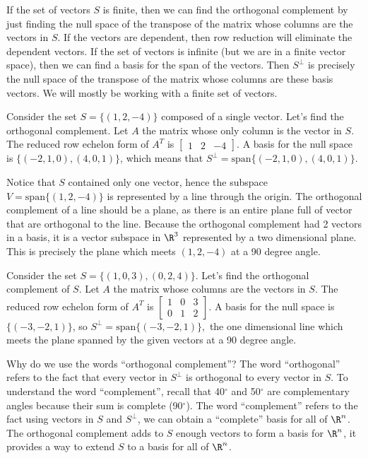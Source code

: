 If the set of vectors $S$ is finite, then we can find the orthogonal complement by just finding the null space of the transpose of the matrix whose columns are the vectors in $S$. 
If the vectors are dependent, then row reduction will eliminate the dependent vectors. 
If the set of vectors is infinite (but we are in a finite vector space), then we can find a basis for the span of the vectors. 
Then $S^\perp$ is precisely the null space of the transpose of the matrix whose columns are these basis vectors.  
We will mostly be working with a finite set of vectors.

\begin{example}
Consider the set  $S=\{(1,2,-4)\}$ composed of a single vector. Let's find the orthogonal complement.
Let $A$ the matrix whose only column is the vector in $S$. 
The reduced row echelon form of $A^T$ is $\begin{bmatrix}1&2&-4\end{bmatrix}$. 
A basis for the null space is $\{(-2,1,0), (4,0,1)\}$, which means that $S^\perp = \text{span}\{(-2,1,0), (4,0,1)\}$. 

Notice that $S$ contained only one vector, hence the subspace $V = \text{span}\{(1,2,-4)\}$ is represented by a line through the origin. 
The orthogonal complement of a line should be a plane, as there is an entire plane full of vector that are orthogonal to the line.  
Because the orthogonal complement had 2 vectors in a basis, it is a vector subspace in $\R^3$ represented by a two dimensional plane. This is precisely the plane which meets $(1,2,-4)$ at a 90 degree angle.  
\end{example}


\begin{example}
Consider the set  $S=\{(1,0,3),(0,2,4)\}$. Let's find the orthogonal complement of $S$.
Let $A$ the matrix whose columns are the vectors in $S$. The reduced row echelon form of $A^T$ is $\begin{bmatrix}1&0&3\\0&1&2\end{bmatrix}$. A basis for the null space is $\{(-3,-2,1)\}$, so $S^\perp = \text{span}\{(-3,-2,1)\},$ the one dimensional line which meets the plane spanned by the given vectors at a 90 degree angle.
\end{example}

Why do we use the words ``orthogonal complement''? The word ``orthogonal'' refers to the fact that every vector in $S^\perp$ is orthogonal to every vector in $S$.  To understand the word ``complement'', recall that 40$^\circ$ and 50$^\circ$ are complementary angles because their sum is complete (90$^\circ$).  The word ``complement'' refers to the fact using vectors in $S$ and $S^\perp$, we can obtain a ``complete'' basis for all of $\R^n$.  The orthogonal complement adds to $S$ enough vectors to form a basis for $\R^n$, it provides a way to extend $S$ to a basis for all of $\R^n$.



